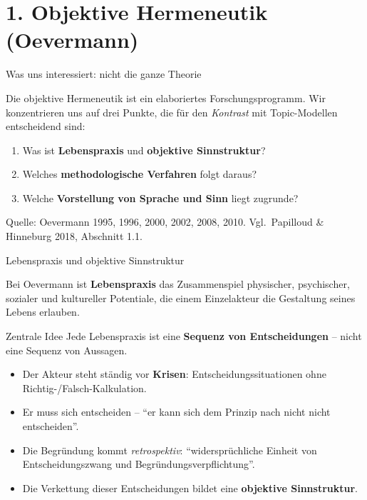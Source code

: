 \documentclass[aspectratio=169,11pt]{beamer}
\let\oldemph\emph
\renewcommand{\emph}[1]{{\color{solCyan}\oldemph{#1}}}
\let\oldtextbf\textbf
\renewcommand{\textbf}[1]{{\color{solBase3}\oldtextbf{#1}}}
\begin{document}
\section{1. Objektive Hermeneutik (Oevermann)}

\begin{frame}{Was uns interessiert: nicht die ganze Theorie}

  Die objektive Hermeneutik ist ein elaboriertes Forschungsprogramm.
  Wir konzentrieren uns auf drei Punkte, die für den \emph{Kontrast}
  mit Topic-Modellen entscheidend sind:

  \vfill
  \begin{enumerate}
    \item Was ist \textbf{Lebenspraxis} und \textbf{objektive Sinnstruktur}?
    \vfill
    \item Welches \textbf{methodologische Verfahren} folgt daraus?
    \vfill
    \item Welche \textbf{Vorstellung von Sprache und Sinn} liegt zugrunde?
  \end{enumerate}

  \vfill
  \footnotesize\color{black!60}
  Quelle: Oevermann 1995, 1996, 2000, 2002, 2008, 2010.
  Vgl.\ Papilloud \& Hinneburg 2018, Abschnitt 1.1.

\end{frame}

\begin{frame}{Lebenspraxis und objektive Sinnstruktur}

  Bei Oevermann ist \textbf{Lebenspraxis} das Zusammenspiel
  physischer, psychischer, sozialer und kultureller Potentiale,
  die einem Einzelakteur die Gestaltung seines Lebens erlauben.

  \vfill
  \begin{block}{Zentrale Idee}
    Jede Lebenspraxis ist eine \textbf{Sequenz von Entscheidungen} –
    nicht eine Sequenz von Aussagen.
  \end{block}

  \vfill
  \begin{itemize}
    \item Der Akteur steht ständig vor \textbf{Krisen}:
          Entscheidungssituationen ohne Richtig-/Falsch-Kalkulation.
    \item Er muss sich entscheiden – \enquote{er kann sich dem Prinzip
          nach nicht nicht entscheiden}.
    \item Die Begründung kommt \emph{retrospektiv}:
          \enquote{widersprüchliche Einheit von Entscheidungszwang
          und Begründungsverpflichtung}.
    \item Die Verkettung dieser Entscheidungen bildet eine
          \textbf{objektive Sinnstruktur}.
  \end{itemize}

\end{frame}
\end{document}
